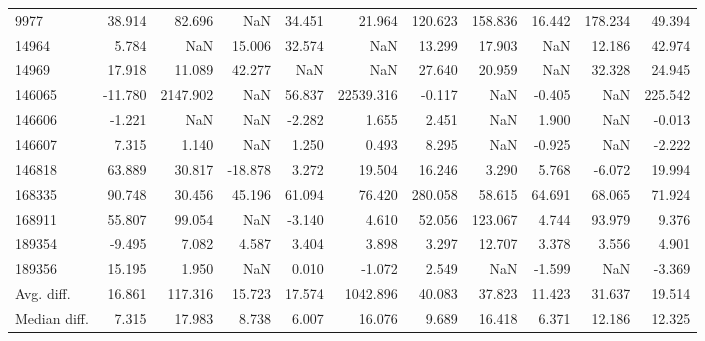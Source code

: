 \begin{tabular}{lrrrrrrrrrr}
9977 & 38.914 & 82.696 & NaN & 34.451 & 21.964 & 120.623 & 158.836 & 16.442 & 178.234 & 49.394 \\
14964 & 5.784 & NaN & 15.006 & 32.574 & NaN & 13.299 & 17.903 & NaN & 12.186 & 42.974 \\
14969 & 17.918 & 11.089 & 42.277 & NaN & NaN & 27.640 & 20.959 & NaN & 32.328 & 24.945 \\
146065 & -11.780 & 2147.902 & NaN & 56.837 & 22539.316 & -0.117 & NaN & -0.405 & NaN & 225.542 \\
146606 & -1.221 & NaN & NaN & -2.282 & 1.655 & 2.451 & NaN & 1.900 & NaN & -0.013 \\
146607 & 7.315 & 1.140 & NaN & 1.250 & 0.493 & 8.295 & NaN & -0.925 & NaN & -2.222 \\
146818 & 63.889 & 30.817 & -18.878 & 3.272 & 19.504 & 16.246 & 3.290 & 5.768 & -6.072 & 19.994 \\
168335 & 90.748 & 30.456 & 45.196 & 61.094 & 76.420 & 280.058 & 58.615 & 64.691 & 68.065 & 71.924 \\
168911 & 55.807 & 99.054 & NaN & -3.140 & 4.610 & 52.056 & 123.067 & 4.744 & 93.979 & 9.376 \\
189354 & -9.495 & 7.082 & 4.587 & 3.404 & 3.898 & 3.297 & 12.707 & 3.378 & 3.556 & 4.901 \\
189356 & 15.195 & 1.950 & NaN & 0.010 & -1.072 & 2.549 & NaN & -1.599 & NaN & -3.369 \\
Avg. diff. & 16.861 & 117.316 & 15.723 & 17.574 & 1042.896 & 40.083 & 37.823 & 11.423 & 31.637 & 19.514 \\
Median diff. & 7.315 & 17.983 & 8.738 & 6.007 & 16.076 & 9.689 & 16.418 & 6.371 & 12.186 & 12.325 \\
\bottomrule
\end{tabular}
